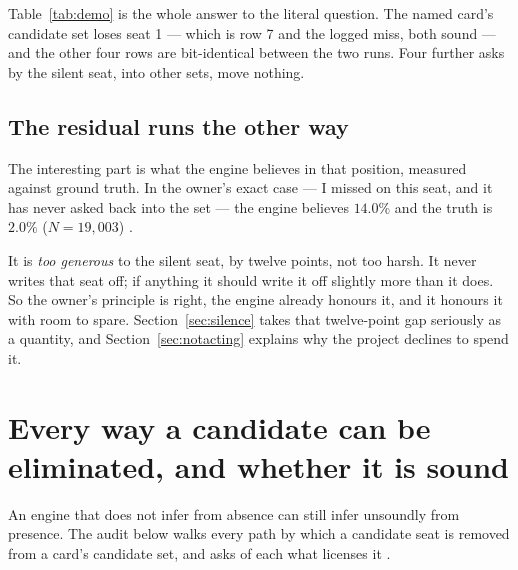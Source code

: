 \documentclass[11pt]{article}
\begin{document}
Table~\ref{tab:demo} is the whole answer to the literal question. The named card's
candidate set loses seat 1 --- which is row 7 and the logged miss, both sound --- and the
other four rows are bit-identical between the two runs. Four further asks by the silent
seat, into other sets, move nothing.

\subsection{The residual runs the other way}
\label{sec:residual}

The interesting part is what the engine believes in that position, measured against
ground truth. In the owner's exact case --- I missed on this seat, and it has never asked
back into the set --- the engine believes $14.0\%$ and the truth is $2.0\%$
($N = 19{,}003$) \cite{asking}.

It is \emph{too generous} to the silent seat, by twelve points, not too harsh. It never
writes that seat off; if anything it should write it off slightly more than it does. So
the owner's principle is right, the engine already honours it, and it honours it with
room to spare. Section~\ref{sec:silence} takes that twelve-point gap seriously as a
quantity, and Section~\ref{sec:notacting} explains why the project declines to spend it.

\section{Every way a candidate can be eliminated, and whether it is sound}
\label{sec:audit}

An engine that does not infer from absence can still infer unsoundly from presence. The
audit below walks every path by which a candidate seat is removed from a card's candidate
set, and asks of each what licenses it \cite{asking,repo}.
\end{document}

